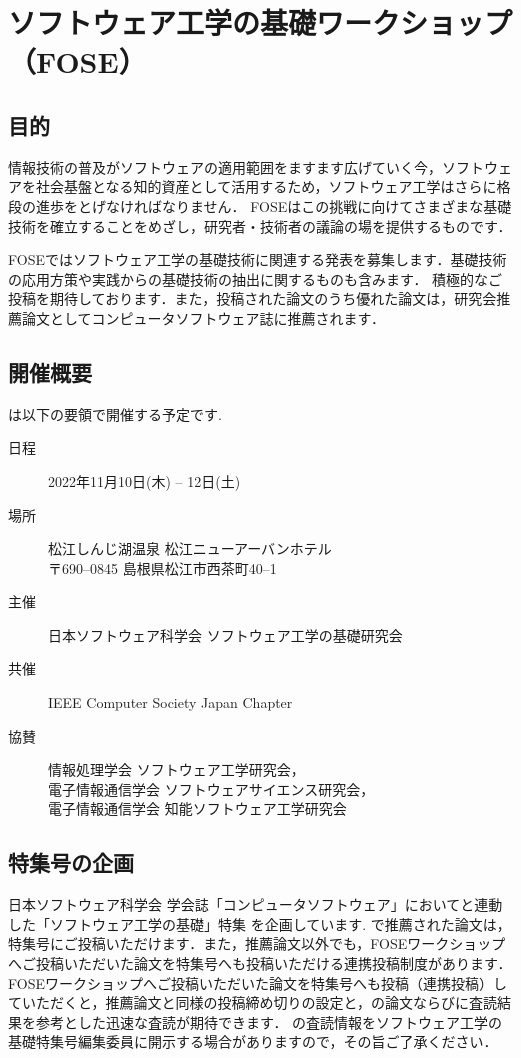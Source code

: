 \documentclass[T,J]{fose} %
\begin{document}
\section{ソフトウェア工学の基礎ワークショップ（FOSE）}
\subsection{目的}
情報技術の普及がソフトウェアの適用範囲をますます広げていく今，ソフトウェアを社会基盤となる知的資産として活用するため，ソフトウェア工学はさらに格段の進歩をとげなければなりません．
FOSEはこの挑戦に向けてさまざまな基礎技術を確立することをめざし，研究者・技術者の議論の場を提供するものです．

FOSEではソフトウェア工学の基礎技術に関連する発表を募集します．基礎技術の応用方策や実践からの基礎技術の抽出に関するものも含みます．
積極的なご投稿を期待しております．また，投稿された論文のうち優れた論文は，研究会推薦論文としてコンピュータソフトウェア誌に推薦されます．


\subsection{開催概要}
\foseabbrev\cite{fose2023}は以下の要領で開催する予定です.
\begin{description}
\item[日程] 2022年11月10日(木) -- 12日(土)
\item[場所] 松江しんじ湖温泉 松江ニューアーバンホテル\\
{\footnotesize
   〒690--0845 島根県松江市西茶町40--1
}
\item[主催] 日本ソフトウェア科学会 ソフトウェア工学の基礎研究会
\item[共催] IEEE Computer Society Japan Chapter
\item[協賛] 情報処理学会 ソフトウェア工学研究会，\\
	電子情報通信学会 ソフトウェアサイエンス研究会，\\
	電子情報通信学会 知能ソフトウェア工学研究会
\end{description}


\subsection{特集号の企画}
日本ソフトウェア科学会 学会誌「コンピュータソフトウェア」において{\foseabbrev}と連動した「ソフトウェア工学の基礎」特集 を企画しています.
{\foseabbrev}で推薦された論文は，特集号にご投稿いただけます．また，推薦論文以外でも，FOSEワークショップへご投稿いただいた論文を特集号へも投稿いただける連携投稿制度があります．
FOSEワークショップへご投稿いただいた論文を特集号へも投稿（連携投稿）していただくと，推薦論文と同様の投稿締め切りの設定と，{\foseabbrev}の論文ならびに査読結果を参考とした迅速な査読が期待できます．
{\foseabbrev}の査読情報をソフトウェア工学の基礎特集号編集委員に開示する場合がありますので，その旨ご了承ください．
\end{document}

